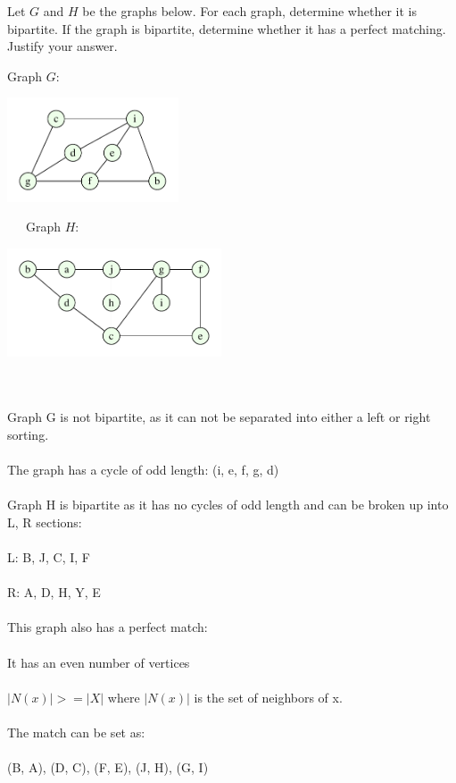 \documentclass{article}
\begin{document}

\begin{problem}
Let $G$ and $H$ be the graphs below. For each graph, determine
whether it is bipartite. 
If the graph is bipartite, determine whether it has a perfect matching.
Justify your answer.
%
\begin{center}
{\large Graph $G$:\ }
\begin{minipage}{2in}
        \includegraphics[width=2in]{HW5_pics/graph3_hw5.pdf}
\end{minipage}
\ \ \
{\large Graph $H$:\ }
\begin{minipage}{2.5in}
        \includegraphics[width=2.5in]{HW5_pics/graph4_hw5.pdf}
\end{minipage}
\hfill
\end{center}
\end{problem}


\begin{solution}

\\\\ Graph G is not bipartite, as it can not be separated into either a left or right sorting.
\\\\ The graph has a cycle of odd length: (i, e, f, g, d)
\newline
\\\\ Graph H is bipartite as it has no cycles of odd length and can be broken up into L, R sections:
\\\\ L: B, J, C, I, F
\\\\ R: A, D, H, Y, E
\\\\ This graph also has a perfect match:
\\\\ It has an even number of vertices
\\\\ $|N(x)| >= |X|$ where $|N(x)|$ is the set of neighbors of x.
\\\\ The match can be set as:
\\\\ (B, A), (D, C), (F, E), (J, H), (G, I)

\end{solution}
\end{document}
